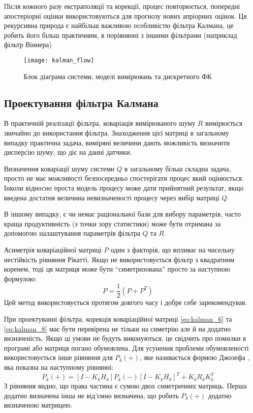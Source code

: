 Після кожного разу екстраполяції та корекції, процес повторюється, попередні
апостеріорні оцінки використовуються для прогнозу нових апріорних оцінок.
Ця рекурсивна природа є найбільш важливою особливістю фільтра Калмана, це робить
його більш практичним, в порівнянні з іншими фільтрами (наприклад фільтр Віннера)
\begin{figure}[here]
\centering
\texttt{[image: kalman\_flow]}
\caption{Блок діаграма системи, моделі вимірювань та дискретного ФК}
\label{fig:kalman_flow}
\end{figure} 

\subsection{Проектування фільтра Калмана}

В практичній реалізації фільтра, коваріація вимірюваного шуму $R$ вимірюється
звичайно до використання фільтра. Знаходження цієї матриці в загальному випадку
практична задача, виміряні величини дають можливість визначити дисперсію шуму, що
діє на данні датчики.

Визначення коваріації шуму системи $Q$ в загальному більш складна задача,
просто не має можливості безпосередньо спостерігати процес який оцінюється.
Інколи відносно проста модель процесу може дати прийнятний результат, якщо
введена достатня величина невизначеності процесу через вибір матриці $Q$.

В іншому випадку, є чи немає раціональної бази для вибору параметрів, часто
краща продуктивність (з точки зору статистики) може бути отримана за допомогою
налаштування параметрів фільтра $Q$ та $R$. 

Асиметрія коваріаційної матриці $P$ один з факторів, що впливає на чисельну
нестійкість рівняння Рікатті. Якщо не використовується фільтр з квадратним
коренем, тоді ця матриця може бути ``симетризована'' просто за наступною 
формулою:
\begin{equation}
 \label{P_symetry}
P= \frac{1}{2}(P+P^{T})
\end{equation}
Цей метод використовується протягом довгого часу і добре себе зарекомендував.

При проектуванні фільтра, корекція коваріаційної матриці \eqref{eq:kalman_6} та
\eqref{eq:kalman_8} має бути перевірена не тільки на симетрію але й на 
додатно визначеність.
Якщо ці умови не будуть виконуються, це свідчить про помилки в програмі або
матриця погано обумовлена. Для усунення проблеми обумовленості використовується
інше рівняння для $P_{k}(+)$, яке називається формою Джозефа \cite{joseph}, яка показна на
наступному рівнянні:
\begin{equation}
 \label{P_plus_Joseph}
P_{k}(+)=[I-K_{k}H_{k}]P_{k}(-)[I-K_{k}H_{k}]^{T}+K_{k}R_{k}K_{k}^{T}
\end{equation}
З рівняння видно, що права частина є сумою двох симетричних матриць.
Перша додатно визначена інша не від'ємно визначена, що робить $P_{k}(+)$ 
додатно визначеною матрицею.

